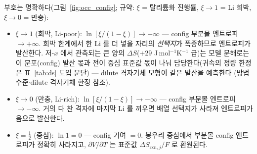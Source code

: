 \documentclass[11pt,a4paper]{article}
\newcommand{\rxn}{\mathrm{rxn}}
\begin{document}
부호는 명확하다(그림~\ref{fig:occ_config}; 규약: $\xi$ = 탈리튬화 진행률, $\xi\to1$ = Li 희박, $\xi\to0$ = 만충):
\begin{itemize}[leftmargin=1.4em,itemsep=1pt]
\item $\xi\to1$ (희박, Li-poor): $\ln[\xi/(1-\xi)]\to+\infty$ — config 부분몰 엔트로피 $\to+\infty$. 희박
한계에서 한 Li 를 더 넣을 자리의 \emph{선택지}가 폭증하므로 엔트로피가 발산한다. 저-$x$ 에서
관측되는 큰 양의 $\Delta S$($+29$ J\,mol$^{-1}$K$^{-1}$ 급)는 모델 분해로는 이 분포(config) 발산 몫과
전이 중심 표준값 몫이 나눠 담당한다(귀속의 정량 한정은 표~\ref{tab:ds} 도입 문단) — dilute 격자기체 모형이 같은
발산을 예측한다 \cite{occupation2019}(방법 수준$\cdot$dilute 격자기체 한정 참조).
\item $\xi\to0$ (만충, Li-rich): $\ln[\xi/(1-\xi)]\to-\infty$ — config 부분몰 엔트로피 $\to-\infty$. 거의 다 찬
격자에 마지막 Li 를 끼우면 배열 선택지가 사라져 엔트로피가 음으로 발산한다.
\item $\xi=\tfrac12$ (중심): $\ln 1=0$ — config 기여 $=0$. 봉우리 중심에서 부분몰 config 엔트로피가 정확히
사라지고, $\partial V/\partial T$ 는 표준값 $\Delta S_{\rxn,j}/F$ 로 환원된다.
\end{itemize}
\end{document}
